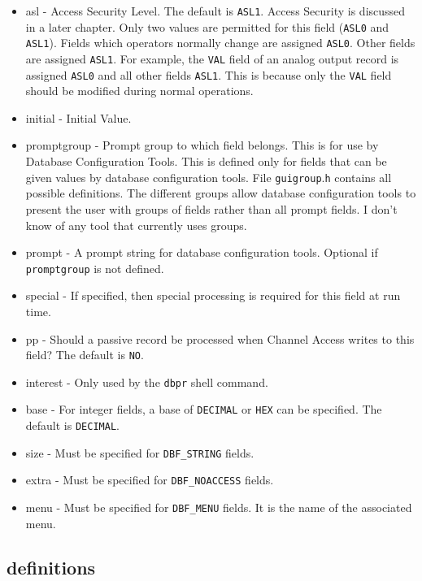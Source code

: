 \begin{itemize}\item {}asl - Access Security Level. The default is \verb|ASL1|. Access Security is discussed in a later chapter. Only two values 
are permitted for this field (\verb|ASL0| and \verb|ASL1|). Fields which operators normally change are assigned \verb|ASL0|. Other 
fields are assigned \verb|ASL1|. For example, the \verb|VAL| field of an analog output record is assigned \verb|ASL0| and all other 
fields \verb|ASL1|. This is because only the \verb|VAL| field should be modified during normal operations.

\item {}initial - Initial Value.

\item {}promptgroup - Prompt group to which field belongs. This is for use by Database Configuration Tools. This is 
defined only for fields that can be given values by database configuration tools. File \verb|guigroup|.\verb|h| contains all 
possible definitions. The different groups allow database configuration tools to present the user with groups of 
fields rather than all prompt fields. I don't know of any tool that currently uses groups.

\item {}prompt - A prompt string for database configuration tools. Optional if \verb|promptgroup| is not defined.

\item {}special - If specified, then special processing is required for this field at run time.

\item {}pp - Should a passive record be processed when Channel Access writes to this field? The default is \verb|NO|.

\item {}interest - Only used by the \verb|dbpr| shell command.

\item {}base - For integer fields, a base of \verb|DECIMAL| or \verb|HEX| can be specified. The default is \verb|DECIMAL|.

\item {}size - Must be specified for \verb|DBF_STRING| fields.

\item {}extra - Must be specified for \verb|DBF_NOACCESS| fields.

\item {}menu - Must be specified for \verb|DBF_MENU| fields. It is the name of the associated menu.

\end{itemize}\subsection{definitions}

